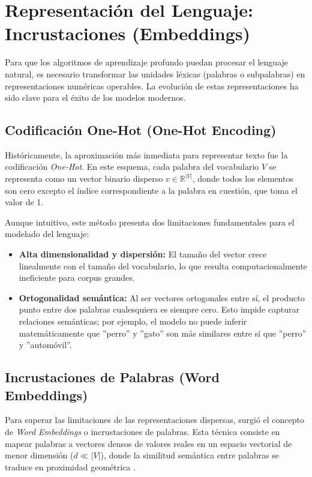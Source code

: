 \documentclass[11pt, a4paper]{article}
\begin{document}
\section{Representación del Lenguaje: Incrustaciones (Embeddings)}

Para que los algoritmos de aprendizaje profundo puedan procesar el lenguaje natural, es necesario transformar las unidades léxicas (palabras o subpalabras) en representaciones 
numéricas operables. La evolución de estas representaciones ha sido clave para el éxito de los modelos modernos.

\subsection{Codificación One-Hot (One-Hot Encoding)}
Históricamente, la aproximación más inmediata para representar texto fue la codificación \textit{One-Hot}. En este esquema, cada palabra del vocabulario $V$ se representa como
un vector binario disperso $v \in \mathbb{R}^{|V|}$, donde todos los elementos son cero excepto el índice correspondiente a la palabra en cuestión, que toma el valor de 1.

Aunque intuitivo, este método presenta dos limitaciones fundamentales para el modelado del lenguaje:
\begin{itemize}
    \item \textbf{Alta dimensionalidad y dispersión:} El tamaño del vector crece linealmente con el tamaño del vocabulario, lo que resulta computacionalmente ineficiente para
    corpus grandes.
    \item \textbf{Ortogonalidad semántica:} Al ser vectores ortogonales entre sí, el producto punto entre dos palabras cualesquiera es siempre cero. Esto impide capturar 
    relaciones semánticas; por ejemplo, el modelo no puede inferir matemáticamente que ''perro'' y ''gato'' son más similares entre sí que ''perro'' y ''automóvil''.
\end{itemize}

\subsection{Incrustaciones de Palabras (Word Embeddings)}
Para superar las limitaciones de las representaciones dispersas, surgió el concepto de \textit{Word Embeddings} o incrustaciones de palabras. Esta técnica consiste en mapear
palabras a vectores densos de valores reales en un espacio vectorial de menor dimensión ($d \ll |V|$), donde la similitud semántica entre palabras se traduce en proximidad
geométrica \cite{atkinson2025}.
\end{document}
